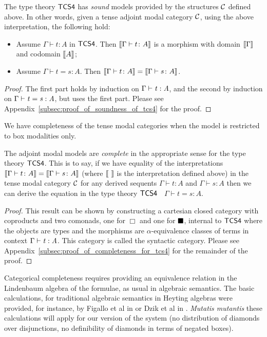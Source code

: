 \begin{theorem}
\label{thm:tcs4-csound}
The type theory $\sf{TCS4}$ has \textit{sound} models provided by the
structures $\cal C$ defined above.  In other words, given a tense
adjoint modal category $\cal C$, using the above interpretation, the
following hold:
\begin{itemize}
\item Assume $\Gamma \vdash t : A$ in $\sf{TCS4}$. Then $\sem{\Gamma
  \vdash t \colon A}$ is a morphism with domain $\sem{\Gamma}$ and
  codomain $\sem{A}$;
\item Assume $\Gamma \vdash t = s \colon A$. Then $\sem{\Gamma
  \vdash t \colon A} = \sem{\Gamma \vdash s \colon A}$.
\end{itemize}
\end{theorem}
\begin{proof}
  The first part holds by induction on $\Gamma  \vdash  \mathit{t}  :  \mathit{A}$, and the
  second by induction on $ \Gamma  \vdash  \mathit{t}  =  \mathit{s}  :  \mathit{A} $, but uses the first
  part.  Please see Appendix~\ref{subsec:proof_of_soundness_of_tcs4}
  for the  proof.  
\end{proof}

We  have completeness of the tense modal categories when the model is restricted to box modalities only.

\begin{theorem}
\label{thm:tcs4-completeness}
The adjoint modal models are \textit{complete} in the appropriate
sense for the type theory $\sf{TCS4}$. This is to say, if we have
equality of the interpretations $\sem{\Gamma \vdash t \colon A} =
\sem{\Gamma \vdash s \colon A}$ (where \mbox{$\sem{\ } $} is the
interpretation defined above) in the tense modal category $\cal C$ for
any derived sequents $\Gamma \vdash t \colon A$ and $\Gamma \vdash s
\colon A$ then we can derive the equation in the type theory
$\sf{TCS4}$ $\;$ $\Gamma \vdash t = s \colon A$.
\end{theorem}
\begin{proof}
  This result can be shown by constructing a cartesian closed category
  with coproducts and two comonads, one for $\Box$ and one for
  $\blacksquare$, internal to $\sf{TCS4}$ where the objects are types and the
  morphisms are $\alpha$-equivalence classes of terms in context $\Gamma  \vdash  \mathit{t}  :  \mathit{A}$.  This category is called the syntactic
  category. Please see
  Appendix~\ref{subsec:proof_of_completeness_for_tcs4} for the
  remainder of the proof.
\end{proof}
Categorical completeness requires providing an equivalence relation in
the Lindenbaum algebra of the formulae, as usual in algebraic
semantics. The basic calculations, for traditional algebraic semantics
in Heyting algebras were provided, for instance, by Figallo et al in
\cite{figallo2014} or Dzik et al in \cite{dzik2010}. \textit{Mutatis mutantis} these calculations will
apply for our version of the system (no distribution of diamonds over
disjunctions, no definibility of diamonds in terms of negated boxes).

